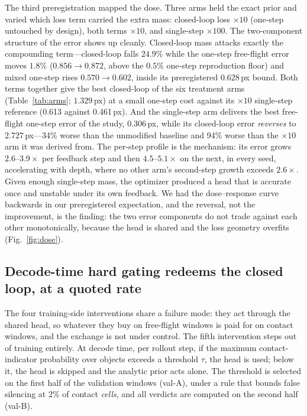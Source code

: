 \documentclass{article}
\begin{document}
The third preregistration mapped the dose. Three arms held the exact prior and varied which loss term carried the extra mass: closed-loop loss $\times10$ (one-step untouched by design), both terms $\times10$, and single-step $\times100$. The two-component structure of the error shows up cleanly. Closed-loop mass attacks exactly the compounding term---closed-loop falls $24.9\%$ while the one-step free-flight error moves $1.8\%$ ($0.856 \to 0.872$, above the $0.5\%$ one-step reproduction floor) and mixed one-step rises $0.570 \to 0.602$, inside its preregistered 0.628\,px bound. Both terms together give the best closed-loop of the six treatment arms (Table~\ref{tab:arms}; $1.329$\,px) at a small one-step cost against its $\times10$ single-step reference (0.613 against 0.461\,px). And the single-step arm delivers the best free-flight one-step error of the study, 0.306\,px, while its closed-loop error \emph{reverses} to 2.727\,px---34\% worse than the unmodified baseline and 94\% worse than the $\times10$ arm it was derived from. The per-step profile is the mechanism: its error grows $2.6$--$3.9\times$ per feedback step and then $4.5$--$5.1\times$ on the next, in every seed, accelerating with depth, where no other arm's second-step growth exceeds $2.6\times$. Given enough single-step mass, the optimizer produced a head that is accurate once and unstable under its own feedback. We had the dose--response curve backwards in our preregistered expectation, and the reversal, not the improvement, is the finding: the two error components do not trade against each other monotonically, because the head is shared and the loss geometry overfits (Fig.~\ref{fig:dose}).

\subsection{Decode-time hard gating redeems the closed loop, at a quoted rate}

The four training-side interventions share a failure mode: they act through the shared head, so whatever they buy on free-flight windows is paid for on contact windows, and the exchange is not under control. The fifth intervention steps out of training entirely. At decode time, per rollout step, if the maximum contact-indicator probability over objects exceeds a threshold $\tau$, the head is used; below it, the head is skipped and the analytic prior acts alone. The threshold is selected on the first half of the validation windows (val-A), under a rule that bounds false silencing at $2\%$ of contact \emph{cells}, and all verdicts are computed on the second half (val-B).
\end{document}
